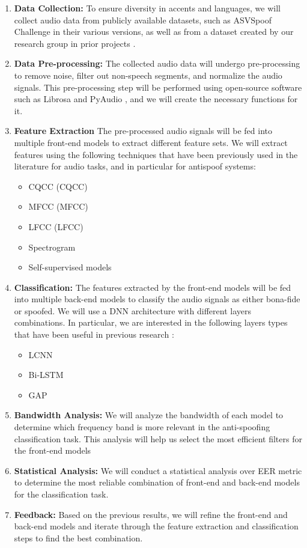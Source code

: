 \begin{enumerate}
    \item \textbf{Data Collection:} To ensure diversity in accents and languages, we will collect audio data from publicly available datasets, such as ASVSpoof Challenge \cite{yamagishi2021asvspoof} in their various versions, as well as from a dataset created by our research group in prior projects \cite{tamayo2022voice}.
    \item \textbf{Data Pre-processing:} The collected audio data will undergo pre-processing to remove noise, filter out non-speech segments, and normalize the audio signals. This pre-processing step will be performed using open-source software such as Librosa \cite{mcfee2015librosa} and PyAudio \cite{neidhardt2017flexible}, and we will create the necessary functions for it.
    \item \textbf{Feature Extraction} The pre-processed audio signals will be fed into multiple front-end models to extract different feature sets. We will extract features using the following techniques that have been previously used in the literature for audio tasks, and in particular for antispoof systems: 
    \begin{itemize}
        \item \acl{CQCC} (\acs{CQCC})
        \item \acl{MFCC} (\acs{MFCC})
        \item \acl{LFCC} (\acs{LFCC})
        \item Spectrogram
        \item Self-supervised models
    \end{itemize}
    \item \textbf{Classification:} The features extracted by the front-end models will be fed into multiple back-end models to classify the audio signals as either bona-fide or spoofed. We will use a \ac{DNN} architecture with different layers combinations. In particular, we are interested in the following layers types that have been useful in previous research \cite{tamayo2022voice}:
    \begin{itemize}
        \item \ac{LCNN}
        \item \ac{Bi-LSTM}
        \item \ac{GAP}
    \end{itemize}
    \item \textbf{Bandwidth Analysis:} We will analyze the bandwidth of each model to determine which frequency band is more relevant in the anti-spoofing classification task. This analysis will help us select the most efficient filters for the front-end models
    \item \textbf{Statistical Analysis:} We will conduct a statistical analysis over EER metric to determine the most reliable combination of front-end and back-end models for the classification task.
    \item \textbf{Feedback:} Based on the previous results, we will refine the front-end and back-end models and iterate through the feature extraction and classification steps to find the best combination.
\end{enumerate}

